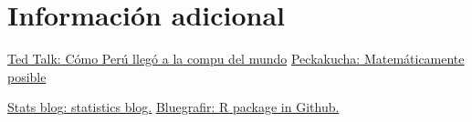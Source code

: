 \documentclass[10pt,a4paper,sans, unicode]{moderncv} %
\begin{document}
\section{Información adicional}
\begin{small}

 {\href{https://www.ted.com/talks/juan_carlos_saravia_por_que_peru_pudo_ir_al_mundial}{\underline{Ted Talk:} Cómo Perú llegó a la compu del mundo}
{\href{https://www.youtube.com/watch?v=kC85LBaDUZo&t=1s}{\underline{Peckakucha:} Matemáticamente posible}}}

 {\href{https://statssos.net}{\underline{Stats blog}: statistics blog.}
{\href{https://github.com/jsaraviadrago/bluegrafir}{\underline{Bluegrafir}: R package in Github.}}}



\end{small}



\end{document}
